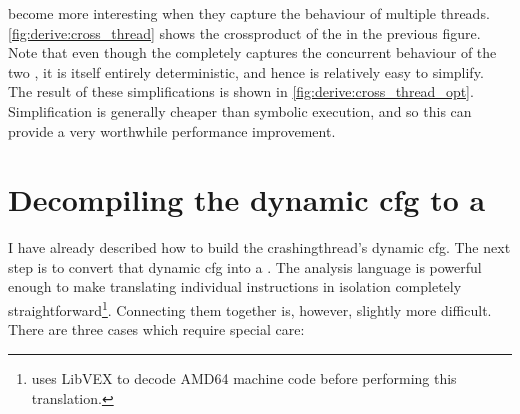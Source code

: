 {\STateMachines} become more interesting when they capture the
behaviour of multiple threads.  \autoref{fig:derive:cross_thread}
shows the \gls{crossproduct} of the {\StateMachines} in the previous
figure.  Note that even though the {\StateMachine} completely captures
the concurrent behaviour of the two {\StateMachines}, it is itself
entirely deterministic, and hence is relatively easy to simplify.  The
result of these simplifications is shown in
\autoref{fig:derive:cross_thread_opt}.  Simplification is generally
cheaper than symbolic execution, and so this can provide a very
worthwhile performance improvement.

\section[Decompiling the dynamic \glsentrytext{cfg} to a \StateMachine]{Decompiling the dynamic \gls{cfg} to a \StateMachine}
\label{sect:derive:compile_cfg}

I have already described how to build the \gls{crashingthread}'s
dynamic \gls{cfg}.  The next step is to convert that dynamic \gls{cfg}
into a {\StateMachine}.  The {\StateMachine} analysis language is
powerful enough to make translating individual instructions in
isolation completely straightforward\footnote{{\Implementation} uses
  LibVEX  to decode AMD64 machine code before performing
  this translation.}.  Connecting them together is, however, slightly
more difficult.  There are three cases which require special care:

